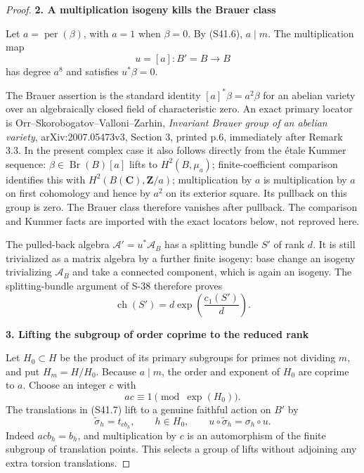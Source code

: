 \begin{proof}
\par

\medskip\noindent\textbf{2. A multiplication isogeny kills the Brauer class}\quad

Let \(a=\operatorname{per}(\beta)\), with \(a=1\) when \(\beta=0\). By (S41.6), \(a\mid m\). The multiplication map \[
 u=[a]:B'=B\longrightarrow B
 \tag{S41.9}
\] has degree \(a^8\) and satisfies \(u^*\beta=0\).

The Brauer assertion is the standard identity \([a]^*\beta=a^2\beta\) for an abelian variety over an algebraically closed field of characteristic zero. An exact primary locator is Orr--Skorobogatov--Valloni--Zarhin, \emph{Invariant Brauer group of an abelian variety}, arXiv:2007.05473v3, Section 3, printed p.6, immediately after Remark 3.3. In the present complex case it also follows directly from the étale Kummer sequence: \(\beta\in\operatorname{Br}(B)[a]\) lifts to \(H^2(B,\mu_a)\); finite-coefficient comparison identifies this with \(H^2(B(\mathbf C),\mathbf Z/a)\); multiplication by \(a\) is multiplication by \(a\) on first cohomology and hence by \(a^2\) on its exterior square. Its pullback on this group is zero. The Brauer class therefore vanishes after pullback. The comparison and Kummer facts are imported with the exact locators below, not reproved here.

The pulled-back algebra \(\mathscr A'=u^*\mathscr A_B\) has a splitting bundle \(S'\) of rank \(d\). It is still trivialized as a matrix algebra by a further finite isogeny: base change an isogeny trivializing \(\mathscr A_B\) and take a connected component, which is again an isogeny. The splitting-bundle argument of S-38 therefore proves \[
 \operatorname{ch}(S')=d\exp\!\left(\frac{c_1(S')}d\right).
 \tag{S41.10}
\]

\par

\medskip\noindent\textbf{3. Lifting the subgroup of order coprime to the reduced rank}\quad

Let \(H_0\subset H\) be the product of its primary subgroups for primes not dividing \(m\), and put \(H_m=H/H_0\). Because \(a\mid m\), the order and exponent of \(H_0\) are coprime to \(a\). Choose an integer \(c\) with \[
 ac\equiv1\pmod{\operatorname{exp}(H_0)}.
\] The translations in (S41.7) lift to a genuine faithful action on \(B'\) by \[
 \widetilde\sigma_h=t_{c b_h},\qquad h\in H_0,
 \qquad u\circ\widetilde\sigma_h=\sigma_h\circ u.
 \tag{S41.11}
\] Indeed \(a c b_h=b_h\), and multiplication by \(c\) is an automorphism of the finite subgroup of translation points. This selects a group of lifts without adjoining any extra torsion translations.


\end{proof}
